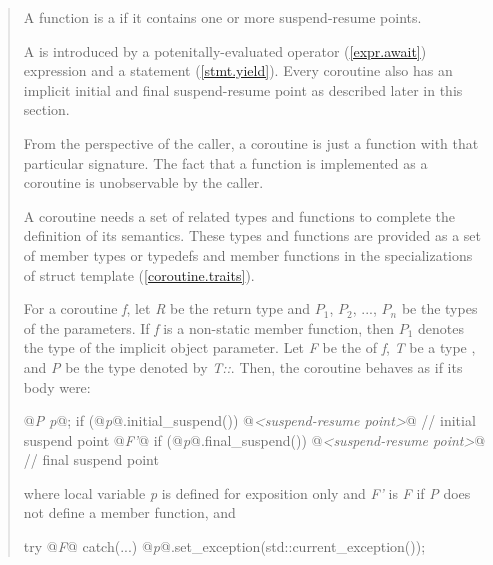 \begin{quote}
\pnum
A function is a  if it contains
one or more suspend-resume points. 

\pnum
A  is introduced by a potenitally-evaluated  operator (\ref{expr.await}) expression and a  statement (\ref{stmt.yield}).
Every coroutine
also has an implicit initial and final suspend-resume point as described later in this section. 

\pnum
\enternote
From the perspective of the caller, a coroutine is just a function with that particular signature. The fact that a function is implemented as a coroutine is unobservable by the caller. 
\exitnote

\pnum
A coroutine needs a set of related types and functions
to complete the definition of its semantics.
These types and functions are provided as a set of member types or typedefs
and member functions in the specializations of struct template
 (\ref{coroutine.traits}). 

\pnum
For a coroutine \textit{f}, let \textit{R} be the return type and $P_1$, $P_2$, ..., $P_n$
be the types of the parameters. If \textit{f} is a non-static member function, then $P_1$ denotes the type of the implicit object parameter. 
Let \textit{F} be the 
of \textit{f}, \textit{T} be a type , and \textit{P} be the type denoted by \textit{T::}. 
Then, the coroutine behaves as if its body were:
\begin{codeblock}
  {
     @\textit{P p}@;
     if (@\textit{p}@.initial_suspend()) {
       @\textit{<suspend-resume point>}@ // initial suspend point
     }
     @\textit{F'}@
     if (@\textit{p}@.final_suspend()) {
       @\textit{<suspend-resume point>}@ // final suspend point
     }
  }
\end{codeblock}
where local variable \textit{p} is 
defined for
exposition only and
\textit{F'} is \textit{F}
if \textit{P} does not define a  member function, 
and 
\begin{codeblock}
  try {@\textit{F}@} catch(...) {@\textit{p}@.set_exception(std::current_exception());}
\end{codeblock}


\end{quote}
